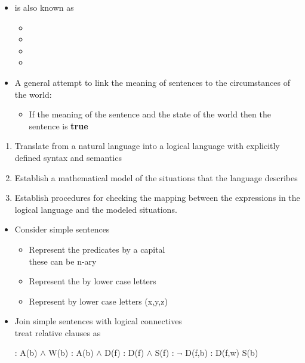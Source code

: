 \documentclass[headrule,footrule]{foils}
\begin{document}

\begin{itemize}
\item {} is also known as
  \begin{itemize}
  \item {}
  \item {}
  \item {}
  \item {}
  \end{itemize}
\item A general attempt to link the meaning of sentences to the
  circumstances of the world: 
  \begin{itemize}
  \item If the meaning of the sentence and the state of the world
     then the sentence is \textbf{true}
  \end{itemize}
\end{itemize}


\begin{enumerate}
\item Translate from a natural language into a logical language
  with explicitly defined syntax and semantics
\item Establish a mathematical model of the situations that the
  language describes
\item Establish procedures for checking the mapping between the
  expressions in the logical language and the modeled situations.
\end{enumerate}


\begin{itemize}
\item Consider simple sentences
  \begin{itemize}
  \item Represent the predicates by a capital 
    \\ these can be n-ary
  \item Represent the  by lower case letters
  \item Represent  by lower case letters (x,y,z)
  \end{itemize}
\item Join simple sentences with logical connectives
\\ treat relative clauses as 
  \begin{exe}
    \ex {}: A(b) $\wedge$ W(b)
    \ex {}: A(b) $\wedge$ D(f)
    \ex {}: D(f) $\wedge$ S(f)
    \ex {}: $\neg$ D(f,b)
    \ex {}: D(f,w) \into S(b)
  \end{exe}
\end{itemize}
\end{document}
